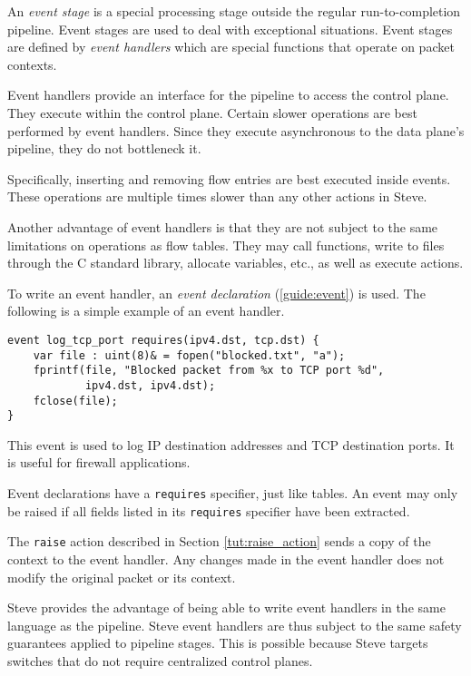 An \textit{event stage} is a special processing stage outside the regular
run-to-completion pipeline. Event stages are used to deal with exceptional
situations. Event stages are defined by \textit{event handlers} which are special
functions that operate on packet contexts. 

Event handlers provide an interface for the pipeline to access the control
plane. They execute within the control plane. Certain slower operations
are best performed by event handlers. Since they execute asynchronous to the
data plane's pipeline, they do not bottleneck it.

Specifically, inserting and removing flow entries are best executed inside
events. These operations are multiple times slower
than any other actions in Steve.

Another advantage of event handlers is that they are not subject to the same
limitations on operations as flow tables. They may call functions,
write to files through the C standard library, allocate variables, etc., as
well as execute actions.

To write an event handler, an \textit{event declaration}
(\ref{guide:event}) is used. The following is a simple example
of an event handler.

\begin{codepage}
\begin{lstlisting}
event log_tcp_port requires(ipv4.dst, tcp.dst) {
	var file : uint(8)& = fopen("blocked.txt", "a");
	fprintf(file, "Blocked packet from %x to TCP port %d", 
			ipv4.dst, ipv4.dst);
	fclose(file);
}
\end{lstlisting}
\end{codepage}

This event is used to log IP destination addresses and
TCP destination ports. It is useful for firewall applications.

Event declarations have a \texttt{requires} specifier, just
like tables. An event may only be raised if all fields listed in its
\texttt{requires} specifier have been extracted.

The \texttt{raise} action described in Section \ref{tut:raise_action}
sends a copy of the context to the event handler.
Any changes made in the event handler does not modify the
original packet or its context.

Steve provides the advantage of being able to write event handlers
in the same language as the pipeline. 
Steve event handlers are thus subject to the same safety
guarantees applied to pipeline stages.
This is possible because Steve targets switches that do not require
centralized control planes.

